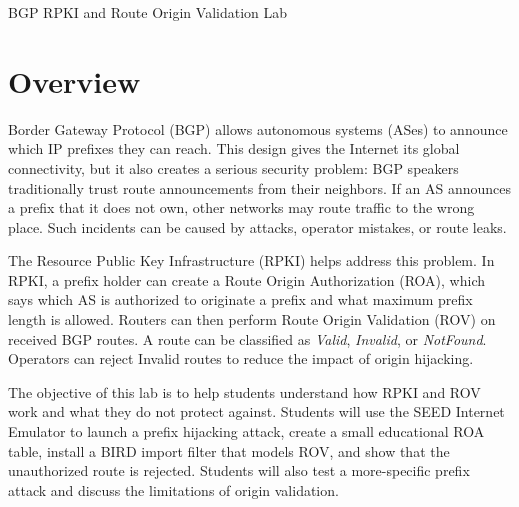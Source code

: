 
\newcommand{\commonfolder}{../../../common-files}







\begin{center}
{\LARGE BGP RPKI and Route Origin Validation Lab}
\end{center}



\section{Overview}

Border Gateway Protocol (BGP) allows autonomous systems (ASes) to announce
which IP prefixes they can reach. This design gives the Internet its global
connectivity, but it also creates a serious security problem: BGP speakers
traditionally trust route announcements from their neighbors. If an AS announces
a prefix that it does not own, other networks may route traffic to the wrong
place. Such incidents can be caused by attacks, operator mistakes, or route
leaks.

The Resource Public Key Infrastructure (RPKI) helps address this problem. In
RPKI, a prefix holder can create a Route Origin Authorization (ROA), which says
which AS is authorized to originate a prefix and what maximum prefix length is
allowed. Routers can then perform Route Origin Validation (ROV) on received BGP
routes. A route can be classified as \textit{Valid}, \textit{Invalid}, or
\textit{NotFound}. Operators can reject Invalid routes to reduce the impact of
origin hijacking.

The objective of this lab is to help students understand how RPKI and ROV work
and what they do not protect against. Students will use the SEED Internet
Emulator to launch a prefix hijacking attack, create a small educational ROA
table, install a BIRD import filter that models ROV, and show that the
unauthorized route is rejected. Students will also test a more-specific prefix
attack and discuss the limitations of origin validation.

